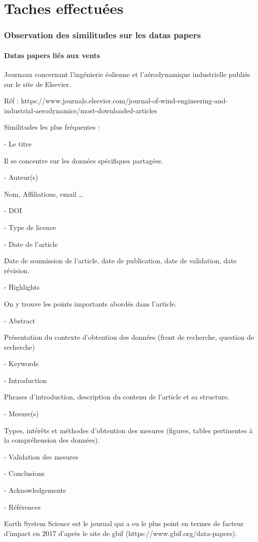 \documentclass[11pt,oneside]{article}
\begin{document}
\part{Taches effectuées}
\section{Observation des similitudes sur les datas papers}
\subsection{Datas papers liés aux vents}
Journaux concernant l’ingénierie éolienne et l’aérodynamique industrielle publiés sur le site de Elsevier.

Réf : https://www.journals.elsevier.com/journal-of-wind-engineering-and-industrial-aerodynamics/most-downloaded-articles

Similitudes les plus fréquentes :

-	Le titre

Il se concentre sur les données spécifiques partagées.

-	Auteur(s)

Nom, Affiliations, email …

-	DOI

-	Type de licence

-	Date de l’article

Date de soumission de l’article, date de publication, date de validation, date révision.

-	Highlights

On y trouve les points importants abordés dans l’article.

-	Abstract

Présentation du contexte d’obtention des données (front de recherche, question de recherche)

-	Keywords

-	Introduction

Phrases d’introduction, description du contenu de l’article et sa structure.

-	Mesure(s)

Types, intérêts et méthodes d’obtention des mesures (figures, tables pertinentes à la compréhension des données).

-	Validation des mesures

-	Conclusions

-	Acknowledgements

-	Références

\newpage
Earth System Science est le journal qui a eu le plus point en termes de facteur d’impact en 2017 d’après le site de gbif (https://www.gbif.org/data-papers).
\end{document}
